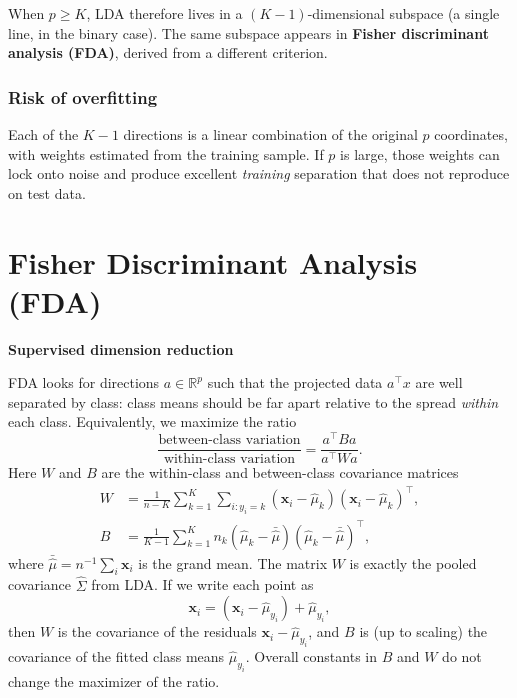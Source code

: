 \documentclass[
]{book}
\begin{document}
When \(p \ge K\), LDA therefore lives in a \((K-1)\)-dimensional subspace (a single line, in the binary case). The same subspace appears in \textbf{Fisher discriminant analysis (FDA)}, derived from a different criterion.

\subsubsection*{Risk of overfitting}\label{risk-of-overfitting}

Each of the \(K-1\) directions is a linear combination of the original \(p\) coordinates, with weights estimated from the training sample. If \(p\) is large, those weights can lock onto noise and produce excellent \emph{training} separation that does not reproduce on test data.

\section{Fisher Discriminant Analysis (FDA)}\label{fisher-discriminant-analysis-fda}

\textbf{Supervised dimension reduction}

FDA looks for directions \(a \in \mathbb{R}^p\) such that the projected data \(a^\top x\) are well separated by class: class means should be far apart relative to the spread \emph{within} each class. Equivalently, we maximize the ratio
\[
\frac{\text{between-class variation}}{\text{within-class variation}} = \frac{a^\top B a}{a^\top W a}.
\]
Here \(W\) and \(B\) are the within-class and between-class covariance matrices
\begin{align*}
W &= \frac{1}{n-K} \sum_{k=1}^{K} \sum_{i: y_i = k} (\mathbf{x}_i - \hat{\mu}_k)(\mathbf{x}_i - \hat{\mu}_k)^\top, \\
B &= \frac{1}{K-1} \sum_{k=1}^{K} n_k (\hat{\mu}_k - \bar{\hat{\mu}})(\hat{\mu}_k - \bar{\hat{\mu}})^\top,
\end{align*}
where \(\bar{\hat{\mu}} = n^{-1}\sum_i \mathbf{x}_i\) is the grand mean. The matrix \(W\) is exactly the pooled covariance \(\hat{\Sigma}\) from LDA. If we write each point as
\[
\mathbf{x}_i = (\mathbf{x}_i - \hat{\mu}_{y_i}) + \hat{\mu}_{y_i},
\]
then \(W\) is the covariance of the residuals \(\mathbf{x}_i - \hat{\mu}_{y_i}\), and \(B\) is (up to scaling) the covariance of the fitted class means \(\hat{\mu}_{y_i}\). Overall constants in \(B\) and \(W\) do not change the maximizer of the ratio.
\end{document}

